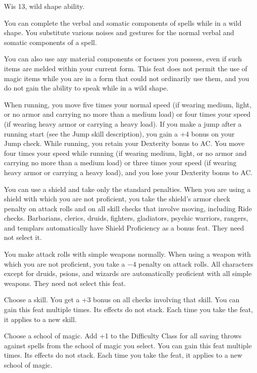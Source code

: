 {Wis 13, wild shape ability.}
{You can complete the verbal and somatic components of spells while in a wild shape. You substitute various noises and gestures for the normal verbal and somatic components of a spell.

You can also use any material components or focuses you possess, even if such items are melded within your current form. This feat does not permit the use of magic items while you are in a form that could not ordinarily use them, and you do not gain the ability to speak while in a wild shape.}

{When running, you move five times your normal speed (if wearing medium, light, or no armor and carrying no more than a medium load) or four times your speed (if wearing heavy armor or carrying a heavy load). If you make a jump after a running start (see the Jump skill description), you gain a +4 bonus on your Jump check. While running, you retain your Dexterity bonus to AC.}
{You move four times your speed while running (if wearing medium, light, or no armor and carrying no more than a medium load) or three times your speed (if wearing heavy armor or carrying a heavy load), and you lose your Dexterity bonus to AC.}{}

{You can use a shield and take only the standard penalties.}
{When you are using a shield with which you are not proficient, you take the shield's armor check penalty on attack rolls and on all skill checks that involve moving, including Ride checks.}
{Barbarians, clerics, druids, fighters, gladiators, psychic warriors, rangers, and templars automatically have Shield Proficiency as a bonus feat. They need not select it.}

{You make attack rolls with simple weapons normally.}
{When using a weapon with which you are not proficient, you take a $-4$ penalty on attack rolls.}
{All characters except for druids, psions, and wizards are automatically proficient with all simple weapons. They need not select this feat.}

{Choose a skill.}{}
{You get a +3 bonus on all checks involving that skill.}{}
{You can gain this feat multiple times. Its effects do not stack. Each time you take the feat, it applies to a new skill.}

{Choose a school of magic.}{}
{Add +1 to the Difficulty Class for all saving throws against spells from the school of magic you select.}{}
{You can gain this feat multiple times. Its effects do not stack. Each time you take the feat, it applies to a new school of magic.}


